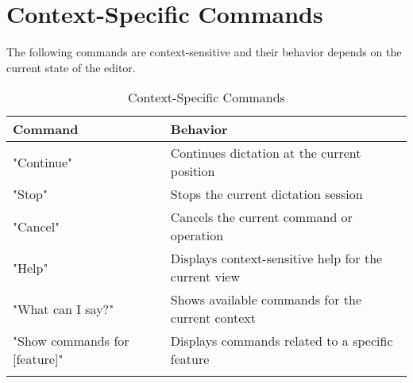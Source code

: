 \section{Context-Specific Commands}

The following commands are context-sensitive and their behavior depends on the current state of the editor.

\begin{longtable}{p{}p{}}
\toprule
\textbf{Command} & \textbf{Behavior} \\
\midrule
\endhead

"Continue" & Continues dictation at the current position \\
"Stop" & Stops the current dictation session \\
"Cancel" & Cancels the current command or operation \\
"Help" & Displays context-sensitive help for the current view \\
"What can I say?" & Shows available commands for the current context \\
"Show commands for [feature]" & Displays commands related to a specific feature \\

\bottomrule
\caption{Context-Specific Commands}
\label{tab:context_commands}
\end{longtable} 